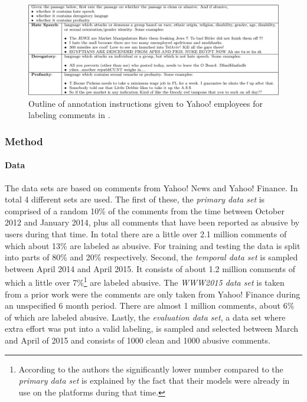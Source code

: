\documentclass{proseminar}
\begin{document}
\begin{figure}
\centering
\includegraphics[width=\textwidth]{img/yahoo_hate_speech}
\caption{Outline of annotation instructions given to Yahoo! employees for labeling comments in \cite{Yahoo:2016}.}
\label{fig:yahoo_hate_speech}
\end{figure}

\subsubsection{Method}
\paragraph{Data} The data sets are based on comments from Yahoo! News and Yahoo! Finance. In total 4 different sets are used. The first of these, the \emph{primary data set} is comprised of a random 10\% of the comments from the time between October 2012 and January 2014, plus all comments that have been reported as abusive by users during that time. In total there are a little over 2.1 million comments of which about 13\% are labeled as abusive. For training and testing the data is split into parts of 80\% and 20\% respectively. Second, the \emph{temporal data set} is sampled between April 2014 and April 2015. It consists of about 1.2 million comments of which a little over 7\%\footnote{According to the authors the significantly lower number compared to the \emph{primary data set} is explained by the fact that their models were already in use on the platforms during that time.} are labeled abusive. The \emph{WWW2015 data set} is taken from a prior work were the comments are only taken from Yahoo! Finance during an unspecified 6 month period. There are almost 1 million comments, about 6\% of which are labeled abusive. Lastly, the \emph{evaluation data set}, a data set where extra effort was put into a valid labeling, is sampled and selected between March and April of 2015 and consists of 1000 clean and 1000 abusive comments.
\end{document}
